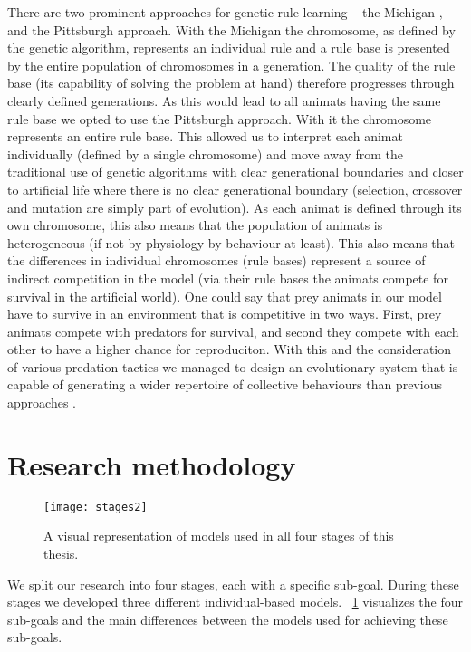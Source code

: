 There are two prominent approaches for genetic rule learning -- the Michigan \cite{holland1977cognitive}, and the Pittsburgh \cite{smith1980learning} approach. With the Michigan the chromosome, as defined by the genetic algorithm, represents an individual rule and a rule base is presented by the entire population of chromosomes in a generation. The quality of the rule base (its capability of solving the problem at hand) therefore progresses through clearly defined generations. As this would lead to all animats having the same rule base we opted to use the Pittsburgh approach. With it the chromosome represents an entire rule base. This allowed us to interpret each animat individually (defined by a single chromosome) and move away from the traditional use of genetic algorithms with clear generational boundaries and closer to artificial life where there is no clear generational boundary (selection, crossover and mutation are simply part of evolution). As each animat is defined through its own chromosome, this also means that the population of animats is heterogeneous (if not by physiology by behaviour at least). This also means that the differences in individual chromosomes (rule bases) represent a source of indirect competition in the model (via their rule bases the animats compete for survival in the artificial world). One could say that prey animats in our model have to survive in an environment that is competitive in two ways. First, prey animats compete with predators for survival, and second they compete with each other to have a higher chance for reproduciton. With this and the consideration of various predation tactics we managed to design an evolutionary system that is capable of generating a wider repertoire of collective behaviours than previous approaches \cite{biswas2014causes,hein2015evolution,olson2013predator,olson2015exploring,olson2016evolution,reynolds1993evolved,sayers2009evolved,spector2003emergence,wood2007evolving}.

\section{Research methodology}

\begin{figure}
	\texttt{[image: stages2]}
	\caption{A visual representation of models used in all four stages of this thesis.}
	\label{fig:stages}
\end{figure}

We split our research into four stages, each with a specific sub-goal. During these stages we developed three different individual-based models. \figurename~\ref{fig:stages} visualizes the four sub-goals and the main differences between the models used for achieving these sub-goals.

